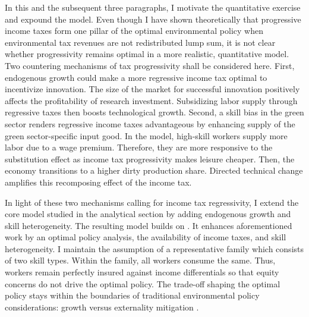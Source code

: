 In this and the subsequent three paragraphs, I motivate the quantitative exercise and expound the model.
Even though I have shown theoretically that progressive income taxes form one pillar of the optimal environmental policy when environmental tax revenues are not redistributed lump sum, it is not clear whether progressivity remains optimal in a more realistic, quantitative model. 
Two countering mechanisms of tax progressivity shall be considered here.
First, endogenous growth could make a more regressive income tax optimal to incentivize innovation. The size of the market for successful innovation positively affects the profitability of research investment. Subsidizing labor supply through regressive taxes then boosts technological growth. Second, a skill bias in the green sector renders regressive income taxes advantageous by enhancing supply of the green sector-specific input good. In the model, high-skill workers supply more labor due to a wage premium. Therefore, they are more responsive to the substitution effect as income tax progressivity makes leisure cheaper. Then, the economy transitions to a higher dirty production share. Directed technical change amplifies this recomposing effect of the income tax. 

In light of these two mechanisms calling for income tax regressivity, I extend the core model studied in the analytical section by adding endogenous growth and skill heterogeneity. The resulting model builds on \cite{Fried2018ClimateAnalysis}. It enhances aforementioned work by an optimal policy analysis, the availability of income taxes, and skill heterogeneity. 
I maintain the assumption of a representative family which consists of two skill types. Within the family, all workers consume the same. Thus, workers remain perfectly insured against income differentials so that equity concerns do not drive the optimal policy. The trade-off shaping the optimal policy stays within the boundaries of traditional environmental policy considerations: growth versus externality mitigation \citep{Stokey1998AreGrowth, Jones2016LifeGrowth, Acemoglu2012TheChange}.  

